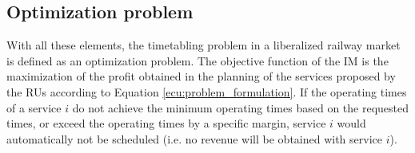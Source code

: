 \documentclass[Afour,sagev,times]{sagej}
\newcommand{\primero}[1]{\textcolor{blue}{#1}}
\begin{document}


\subsection{Optimization problem}
\label{sec:optimization_problem}

With all these elements, the timetabling problem in a liberalized railway market is defined as an optimization problem. The objective function of the \gls{IM} is the maximization of the profit obtained in the planning of the services proposed by the \glspl{RU} according to Equation \ref{ecu:problem_formulation}. If the operating times of a service $ i $ do not achieve the minimum operating times based on the requested times, or exceed the operating times by a specific margin, service $ i $ would automatically not be scheduled (i.e. no revenue will be obtained with service $ i $). 
\end{document}
